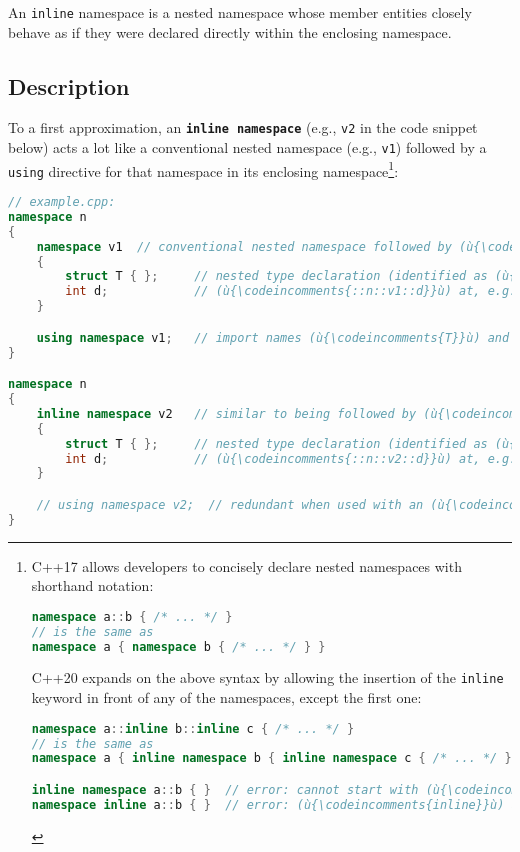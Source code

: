 

An \texttt{inline} namespace is a nested namespace whose member entities
closely behave as if they were declared directly within the enclosing
namespace.

\subsection[Description]{Description}\label{description-inlinenamespace}

To a first approximation, an \textbf{\texttt{inline}~\texttt{namespace}}
(e.g., \texttt{v2} in the code snippet below) acts a lot like a
conventional nested namespace (e.g., \texttt{v1}) followed by a
\texttt{using} directive for that namespace in its enclosing namespace{\cprotect\footnote{C++17 allows developers to concisely declare nested
namespaces with shorthand notation:
\begin{lstlisting}[language=C++, basicstyle={\ttfamily\footnotesize}]
namespace a::b { /* ... */ }
// is the same as
namespace a { namespace b { /* ... */ } }
\end{lstlisting}
C++20 expands on the above syntax by allowing the insertion of the
\texttt{inline} keyword in front of any of the namespaces, except the
first one:
\begin{lstlisting}[language=C++, basicstyle={\ttfamily\footnotesize}]
namespace a::inline b::inline c { /* ... */ }
// is the same as
namespace a { inline namespace b { inline namespace c { /* ... */ } } }

inline namespace a::b { }  // error: cannot start with (ù{\codeincomments{inline}}ù) for compound namespace names
namespace inline a::b { }  // error: (ù{\codeincomments{inline}}ù) at front of sequence explicitly disallowed
\end{lstlisting}
      }}:

\begin{lstlisting}[language=C++]
// example.cpp:
namespace n
{
    namespace v1  // conventional nested namespace followed by (ù{\codeincomments{using}}ù) directive
    {
        struct T { };     // nested type declaration (identified as (ù{\codeincomments{::n::v1::T}}ù))
        int d;            // (ù{\codeincomments{::n::v1::d}}ù) at, e.g., (ù{\codeincomments{0x01a64e90}}ù)
    }

    using namespace v1;   // import names (ù{\codeincomments{T}}ù) and (ù{\codeincomments{d}}ù) into (ù{\codeincomments{namespace n}}ù)
}

namespace n
{
    inline namespace v2   // similar to being followed by (ù{\codeincomments{using namespace v2}}ù)
    {
        struct T { };     // nested type declaration (identified as (ù{\codeincomments{::n::v2::T}}ù))
        int d;            // (ù{\codeincomments{::n::v2::d}}ù) at, e.g., (ù{\codeincomments{0x01a64e94}}ù)
    }

    // using namespace v2;  // redundant when used with an (ù{\codeincomments{inline namespace}}ù)
}
\end{lstlisting}

